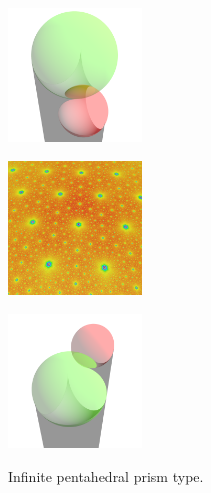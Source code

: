 \begin{figure}[h!tbp]
 \begin{minipage}[t]{0.5\textwidth}
  \begin{minipage}[t]{0.24\textwidth}
   \centering
   \includegraphics[width=1.4in, height=1.4in, keepaspectratio]{./img/application/sphairahedron/variations/pentahedralPrism/nflatPrism.png}
   \label{fig:semi-prism-under}
  \end{minipage}
  \hspace*{\fill}
  \begin{minipage}[t]{0.24\textwidth}
   \centering
   \includegraphics[width=1.4in, height=1.4in, keepaspectratio]{./img/application/sphairahedron/variations/pentahedralPrism/flat.jpg}
   \label{fig:semi-prism-under-limit}
  \end{minipage}
  \hspace*{\fill}
  \caption{Infinite pentahedral prism type.}
  \label{fig:semi-sphaira-under}
 \end{minipage}
 \begin{minipage}[t]{0.5\textwidth}
  \begin{minipage}[t]{0.24\textwidth}
   \centering
   \includegraphics[width=1.4in, height=1.4in, keepaspectratio]{./img/application/sphairahedron/variations/pentahedralPrism/nglowPrism.png}
   \label{fig:semi-prism-glow}

\end{minipage}
\end{minipage}
\end{figure}
